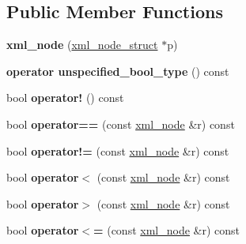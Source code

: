 \subsection*{Public Member Functions}
\begin{DoxyCompactItemize}
\item 
\hypertarget{classpugi_1_1xml__node_afc9b1ed8891dfed9ce5ab5288a9ad4a1}{{\bfseries xml\+\_\+node} (\hyperlink{structpugi_1_1xml__node__struct}{xml\+\_\+node\+\_\+struct} $\ast$p)}\label{classpugi_1_1xml__node_afc9b1ed8891dfed9ce5ab5288a9ad4a1}

\item 
\hypertarget{classpugi_1_1xml__node_af30001c73a3454a1e3794a850d3963c0}{{\bfseries operator unspecified\+\_\+bool\+\_\+type} () const }\label{classpugi_1_1xml__node_af30001c73a3454a1e3794a850d3963c0}

\item 
\hypertarget{classpugi_1_1xml__node_a03c028fd83e07cda3f433f9eea3466ff}{bool {\bfseries operator!} () const }\label{classpugi_1_1xml__node_a03c028fd83e07cda3f433f9eea3466ff}

\item 
\hypertarget{classpugi_1_1xml__node_aaf46fa45a1a117ca95867f37ade363c2}{bool {\bfseries operator==} (const \hyperlink{classpugi_1_1xml__node}{xml\+\_\+node} \&r) const }\label{classpugi_1_1xml__node_aaf46fa45a1a117ca95867f37ade363c2}

\item 
\hypertarget{classpugi_1_1xml__node_aa31095e51422a8a11b8d4832e0db71ed}{bool {\bfseries operator!=} (const \hyperlink{classpugi_1_1xml__node}{xml\+\_\+node} \&r) const }\label{classpugi_1_1xml__node_aa31095e51422a8a11b8d4832e0db71ed}

\item 
\hypertarget{classpugi_1_1xml__node_a2a57731a8d90392f88febf551bd5a924}{bool {\bfseries operator$<$} (const \hyperlink{classpugi_1_1xml__node}{xml\+\_\+node} \&r) const }\label{classpugi_1_1xml__node_a2a57731a8d90392f88febf551bd5a924}

\item 
\hypertarget{classpugi_1_1xml__node_a983e49938a893181fd8cc905c4c67f64}{bool {\bfseries operator$>$} (const \hyperlink{classpugi_1_1xml__node}{xml\+\_\+node} \&r) const }\label{classpugi_1_1xml__node_a983e49938a893181fd8cc905c4c67f64}

\item 
\hypertarget{classpugi_1_1xml__node_a09568e579d8c1b6bff12594bfb4246b6}{bool {\bfseries operator$<$=} (const \hyperlink{classpugi_1_1xml__node}{xml\+\_\+node} \&r) const }\label{classpugi_1_1xml__node_a09568e579d8c1b6bff12594bfb4246b6}


\end{DoxyCompactItemize}
